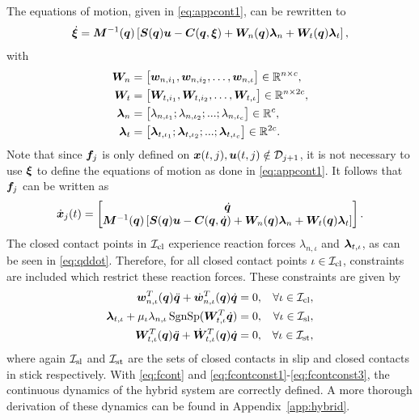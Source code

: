 \documentclass[../DC2017114Bouma.tex]{subfiles}
\begin{document}
The equations of motion, given in \eqref{eq:appcont1}, can be rewritten to
\begin{align}
\dot{\boldsymbol{\xi}} = {\boldsymbol{M}}^{-1}({\boldsymbol{q}})\left[ {\boldsymbol{S}}({\boldsymbol{q}}){\boldsymbol{u}} - {\boldsymbol{C}}({\boldsymbol{q}},\boldsymbol{\xi}) + {\boldsymbol{W}}_{n}({\boldsymbol{q}})\boldsymbol{\lambda}_{n} + {\boldsymbol{W}}_{t}({\boldsymbol{q}})\boldsymbol{\lambda}_{t}\right],\label{eq:qddot}
\end{align}
with
\begin{align*}
{\boldsymbol{W}}_n &= \begin{bmatrix}
{\boldsymbol{w}}_{n,i_1},{\boldsymbol{w}}_{n,i_2},\dots,{\boldsymbol{w}}_{n,\iota}
\end{bmatrix}\in\mathbb{R}^{n\times c},\\
{\boldsymbol{W}}_t &= \begin{bmatrix}
{\boldsymbol{W}}_{t,i_1},{\boldsymbol{W}}_{t,i_2},\dots,{\boldsymbol{W}}_{t,\iota} 
\end{bmatrix}\in\mathbb{R}^{n\times 2c},\\
\boldsymbol{\lambda}_n &= \begin{bmatrix}
\lambda_{n,\iota_1};\lambda_{n,\iota_2};...;\lambda_{n,\iota_c} 
\end{bmatrix}\in\mathbb{R}^{c},\\
\boldsymbol{\lambda}_t &= \begin{bmatrix}
\boldsymbol{\lambda}_{t,\iota_1};\boldsymbol{\lambda}_{t,\iota_2};...;\boldsymbol{\lambda}_{t,\iota_c} 
\end{bmatrix}\in\mathbb{R}^{2c}.
\end{align*}
Note that since ${\boldsymbol{f}}_j$ is only defined on ${\boldsymbol{x}}(t,j),{\boldsymbol{u}}(t,j)\notin \mathcal{D}_{j+1}$, it is not necessary to use $\boldsymbol{\xi}$ to define the equations of motion as done in \eqref{eq:appcont1}. It follows that ${\boldsymbol{f}}_j$ can be written as
\begin{align}
\dot{{\boldsymbol{x}}}_j(t) =\begin{bmatrix}
\dot{{\boldsymbol{q}}}\\ {\boldsymbol{M}}^{-1}({\boldsymbol{q}})\left[ {\boldsymbol{S}}({\boldsymbol{q}}){\boldsymbol{u}} - {\boldsymbol{C}}({\boldsymbol{q}},\dot{{\boldsymbol{q}}}) + {\boldsymbol{W}}_{n}({\boldsymbol{q}})\boldsymbol{\lambda}_{n} + {\boldsymbol{W}}_{t}({\boldsymbol{q}})\boldsymbol{\lambda}_{t}\right]
\end{bmatrix}.\label{eq:fcont}
\end{align}
The closed contact points in $\mathcal{I}_{\text{cl}}$ experience reaction forces $\lambda_{n,\iota}$ and $\boldsymbol{\lambda}_{t,\iota}$, as can be seen in \eqref{eq:qddot}. Therefore, for all closed contact points $\iota\in\mathcal{I}_{\text{cl}}$, constraints are included which restrict these reaction forces. These constraints are given by
\begin{align}
{\boldsymbol{w}}^T_{n,\iota}({\boldsymbol{q}})\ddot{{\boldsymbol{q}}} + \dot{{\boldsymbol{w}}}^T_{n,\iota}({\boldsymbol{q}})\dot{{\boldsymbol{q}}} &= 0, &\forall \iota\in\mathcal{I}_{\text{cl}},\label{eq:fcontconst1}\\
\boldsymbol{\lambda}_{t,\iota} + \mu_{\iota}\lambda_{n,\iota}\operatorname{\text{SgnSp}}({\boldsymbol{W}}_{t,\iota}^T\dot{{\boldsymbol{q}}}) &= 0, &\forall \iota\in\mathcal{I}_{\text{sl}},\label{eq:fcontconst2}\\
{\boldsymbol{W}}^T_{t,\iota}({\boldsymbol{q}})\ddot{{\boldsymbol{q}}} + \dot{{\boldsymbol{W}}}^T_{t,\iota}({\boldsymbol{q}})\dot{{\boldsymbol{q}}} &= 0, &\forall \iota\in\mathcal{I}_{\text{st}},\label{eq:fcontconst3}
\end{align}
where again $\mathcal{I}_{\text{sl}}$ and $\mathcal{I}_{\text{st}}$ are the sets of closed contacts in slip and closed contacts in stick respectively. With \eqref{eq:fcont} and \eqref{eq:fcontconst1}-\eqref{eq:fcontconst3}, the continuous dynamics of the hybrid system are correctly defined. A more thorough derivation of these dynamics can be found in Appendix~\ref{app:hybrid}.
\end{document}
